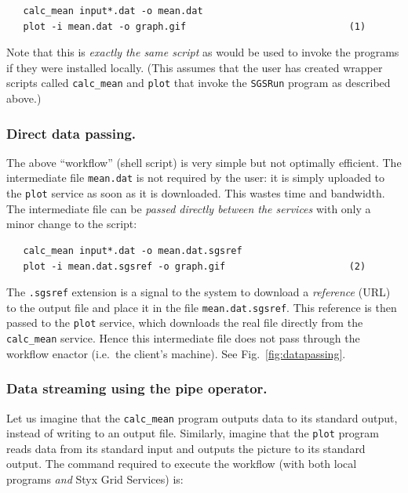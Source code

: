 \documentclass[a4paper]{article}
\begin{document}
\begin{verbatim}
   calc_mean input*.dat -o mean.dat
   plot -i mean.dat -o graph.gif                             (1)
\end{verbatim}

Note that this is \textit{exactly the same script\/} as would be used to invoke the programs if they were installed locally.  (This assumes that the user has created wrapper scripts called \texttt{calc\_mean} and \texttt{plot} that invoke the \texttt{SGSRun} program as described above.)

\subsubsection{Direct data passing.}\label{sec:datapassing}

The above ``workflow'' (shell script) is very simple but not optimally efficient.  The intermediate file \texttt{mean.dat} is not required by the user: it is simply uploaded to the \texttt{plot} service as soon as it is downloaded.  This wastes time and bandwidth.  The intermediate file can be \textit{passed directly between the services\/} with only a minor change to the script:

\begin{verbatim}
   calc_mean input*.dat -o mean.dat.sgsref
   plot -i mean.dat.sgsref -o graph.gif                      (2)
\end{verbatim}

The \texttt{.sgsref} extension is a signal to the system to download a \textit{reference\/} (URL) to the output file and place it in the file \texttt{mean.dat.sgsref}.  This reference is then passed to the \texttt{plot} service, which downloads the real file directly from the \texttt{calc\_mean} service.  Hence this intermediate file does not pass through the workflow enactor (i.e.\ the client's machine).  See Fig.~\ref{fig:datapassing}.


\subsubsection{Data streaming using the pipe operator.}\label{sec:pipes}
Let us imagine that the \texttt{calc\_mean} program outputs data to its standard output, instead of writing to an output file.  Similarly, imagine that the \texttt{plot} program reads data from its standard input and outputs the picture to its standard output.  The command required to execute the workflow (with both local programs \textit{and\/} Styx Grid Services) is:
\end{document}
